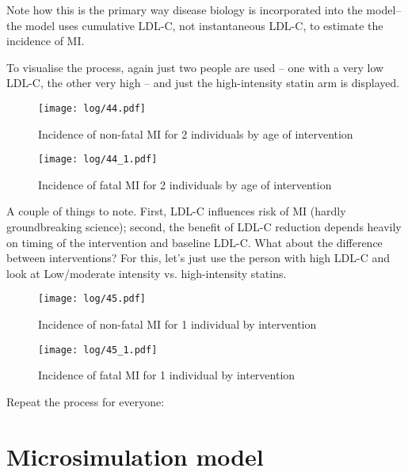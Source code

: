\documentclass[11pt]{article}
\begin{document}
Note how this is the primary way disease biology is incorporated into the model--
the model uses cumulative LDL-C, not instantaneous LDL-C, to estimate the incidence of MI. 

To visualise the process, again just two people are used -- one with a very low LDL-C, the other very high
-- and just the high-intensity statin arm is displayed.

\color{Blue4}
\begin{figure}
    \centering
    \texttt{[image: log/44.pdf]}
    \caption{Incidence of non-fatal MI for 2 individuals by age of intervention}
    \label{nfMIincLDL1}
\end{figure}
\begin{figure}
    \centering
    \texttt{[image: log/44\_1.pdf]}
    \caption{Incidence of fatal MI for 2 individuals by age of intervention}
    \label{fMIincLDL1}
\end{figure}
\begin{stlog}\end{stlog}
\color{black}
A couple of things to note. First, LDL-C influences risk of MI (hardly groundbreaking science); 
second, the benefit of LDL-C reduction depends heavily on timing of the intervention and baseline LDL-C. 
What about the difference between interventions? For this, let's just use the person with high LDL-C and
look at Low/moderate intensity vs. high-intensity statins.
\color{Blue4}
\begin{figure}
    \centering
    \texttt{[image: log/45.pdf]}
    \caption{Incidence of non-fatal MI for 1 individual by intervention}
    \label{nfMIincLDL2}
\end{figure}
\begin{figure}
    \centering
    \texttt{[image: log/45\_1.pdf]}
    \caption{Incidence of fatal MI for 1 individual by intervention}
    \label{fMIincLDL2}
\end{figure}
\begin{stlog}\end{stlog}
\color{black}
Repeat the process for everyone: 
\color{Blue4}
\begin{stlog}\end{stlog}
\color{black}

\clearpage
\pagebreak
\section{Microsimulation model}
\end{document}
